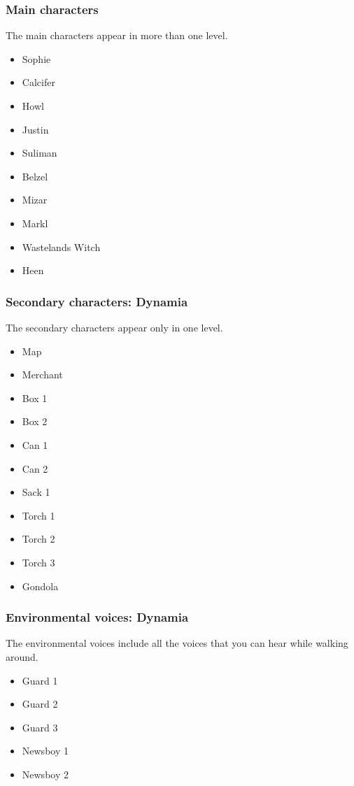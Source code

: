\subsubsection*{Main characters}
The main characters appear in more than one level.
\begin{itemize}
	\item Sophie
	\item Calcifer
	\item Howl
	\item Justin
	\item Suliman
	\item Belzel
	\item Mizar
	\item Markl
	\item Wastelands Witch
	\item Heen
\end{itemize}

\subsubsection*{Secondary characters: Dynamia}
The secondary characters appear only in one level.
\begin{itemize}
	\item Map
	\item Merchant
	\item Box 1
	\item Box 2
	\item Can 1
	\item Can 2
	\item Sack 1
	\item Torch 1
	\item Torch 2
	\item Torch 3
	\item Gondola
\end{itemize}

\subsubsection*{Environmental voices: Dynamia}
The environmental voices include all the voices that you can hear while walking around.
\begin{itemize}
	\item Guard 1
	\item Guard 2
	\item Guard 3
	\item Newsboy 1
	\item Newsboy 2
\end{itemize}
